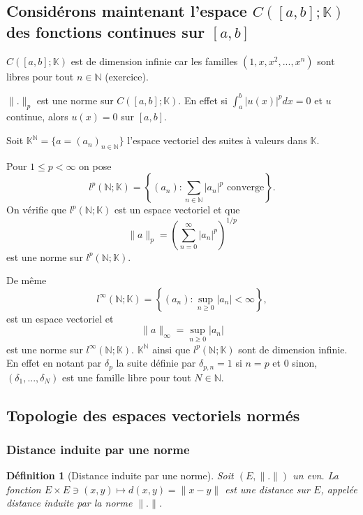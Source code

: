 \documentclass{article}
\newtheorem{definition}{Définition}
\begin{document}
\subsection{Considérons maintenant l'espace $C([a, b]; \mathbb{K})$ des fonctions continues sur $[a, b]$}
$C([a, b]; \mathbb{K})$ est de dimension infinie car les familles $(1, x, x^2, ..., x^n)$ sont libres pour tout $n \in \mathbb{N}$ (exercice).

$\|.\|_p$ est une norme sur $C([a, b]; \mathbb{K})$. En effet si $\int_a^b |u(x)|^p dx = 0$ et $u$ continue, alors $u(x) = 0$ sur $[a, b]$.

Soit $\mathbb{K}^\mathbb{N} = \{a = (a_n)_{n \in \mathbb{N}}\}$ l'espace vectoriel des suites à valeurs dans $\mathbb{K}$.

Pour $1 \leq p < \infty$ on pose
\begin{equation}
    l^p(\mathbb{N}; \mathbb{K}) = \left\{ (a_n) : \sum_{n \in \mathbb{N}} |a_n|^p \text{ converge} \right\}.
\end{equation}
On vérifie que $l^p(\mathbb{N}; \mathbb{K})$ est un espace vectoriel et que
\begin{equation}
    \|a\|_p = \left( \sum_{n=0}^\infty |a_n|^p \right)^{1/p}
\end{equation}
est une norme sur $l^p(\mathbb{N}; \mathbb{K})$.

De même
\begin{equation}
    l^\infty(\mathbb{N}; \mathbb{K}) = \left\{ (a_n) : \sup_{n \geq 0} |a_n| < \infty \right\},
\end{equation}
est un espace vectoriel et
\begin{equation}
    \|a\|_\infty = \sup_{n \geq 0} |a_n|
\end{equation}
est une norme sur $l^\infty(\mathbb{N}; \mathbb{K})$. $\mathbb{K}^\mathbb{N}$ ainsi que $l^p(\mathbb{N}; \mathbb{K})$ sont de dimension infinie. En effet en notant par $\delta_p$ la suite définie par $\delta_{p,n} = 1$ si $n=p$ et $0$ sinon, $(\delta_1, ..., \delta_N)$ est une famille libre pour tout $N \in \mathbb{N}$.

\subsection{Topologie des espaces vectoriels normés}

\subsubsection{Distance induite par une norme}
\begin{definition}[Distance induite par une norme]
\label{def:distance_induite}
Soit $(E, \|.\|)$ un evn. La fonction $E \times E \ni (x, y) \mapsto d(x, y) = \|x-y\|$ est une distance sur $E$, appelée distance induite par la norme $\|.\|$.
\end{definition}
\end{document}
